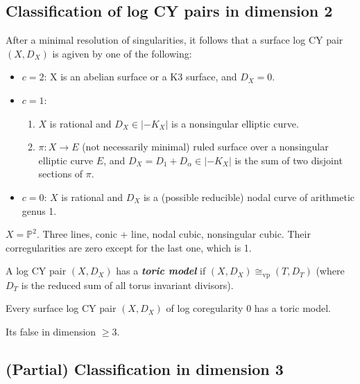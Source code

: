 \subsection{Classification of log CY pairs in dimension 2}

After a minimal resolution of singularities, it follows that a surface log CY pair $(X,D_X)$ is agiven by one of the following:

\begin{itemize}
	\item $c=2$: X is an abelian surface or a K3 surface, and $D_X=0$.

	\item $c=1$:
		 \begin{enumerate}[label=(\roman*)]
			\item $X$ is rational and $D_X\in |-K_X|$ is a nonsingular elliptic curve.
			\item $\pi:X\to E$ (not necessarily minimal) ruled surface over a nonsingular elliptic curve $E$, and $D_X=D_1+D_\alpha\in |-K_{X}|$ is the sum of two disjoint sections of $ \pi$.
		\end{enumerate}
	
	\item $c=0$:  $X$ is rational and $D_X$ is a (possible reducible) nodal curve of arithmetic genus 1.
\end{itemize}

\begin{example}
	$X=\mathbb{P}^2$. Three lines, conic + line, nodal cubic, nonsingular cubic. Their corregularities are zero except for the last one, which is 1.
\end{example}

\begin{defn}
A log CY pair $(X,D_X)$ has a \textit{\textbf{toric model}} if $(X,D_X)\cong_{\operatorname{vp}}(T,D_T)$ (where $D_T$ is the reduced sum of all torus invariant divisors).
\end{defn}

\begin{thm}\leavevmode
	Every surface log CY pair $(X,D_X)$ of log coregularity 0 has a toric model.
\end{thm}

\begin{remark}
	Its false in dimension $\geq 3$.
\end{remark}

\subsection{(Partial) Classification in dimension 3}


